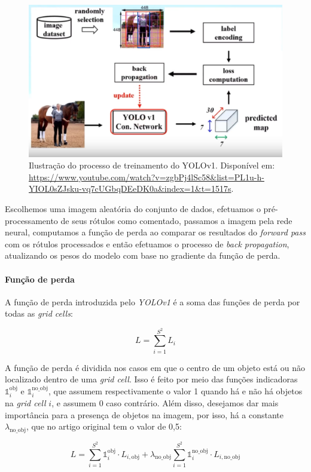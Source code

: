 \begin{figure}[htb!]
    \centering
    \includegraphics[width=0.8\linewidth]{images/yolo_train.png}
    \caption{\label{fig:yolo_train} Ilustração do processo de treinamento do YOLOv1. Disponível em: \url{https://www.youtube.com/watch?v=zgbPj4lSc58&list=PL1u-h-YIOL0sZJsku-vq7cUGbqDEeDK0a&index=1&t=1517s}.}
\end{figure}

Escolhemos uma imagem aleatória do conjunto de dados, efetuamos o pré-processamento de seus rótulos como comentado, passamos a imagem pela rede neural, computamos a função de perda ao comparar os resultados do \emph{forward pass} com os rótulos processados e então efetuamos o processo de \emph{back propagation}, atualizando os pesos do modelo com base no gradiente da função de perda. 

\paragraph{Função de perda}
A função de perda introduzida pelo \emph{YOLOv1} é a soma das funções de perda por todas as \emph{grid cells}:
\begin{center}
\[
L = \sum_{i=1}^{S^2} L_i
\]
\end{center}
A função de perda é dividida nos casos em que o centro de um objeto está ou não localizado dentro de uma \emph{grid cell}. Isso é feito por meio das funções indicadoras $\mathds{1}_i^{\text{obj}}$ e $\mathds{1}_i^{\text{no\_obj}}$, que assumem respectivamente o valor 1 quando há e não há objetos na \emph{grid cell} $i$, e assumem 0 caso contrário. Além disso, desejamos dar mais importância para a presença de objetos na imagem, por isso, há a constante $\lambda_{\text{no\_obj}}$, que no artigo original tem o valor de 0,5:
\begin{center}
\[
L = \sum_{i=1}^{S^2} \mathds{1}_i^{\text{obj}} \cdot L_{i, \text{obj}} + \lambda_{\text{no\_obj}} \sum_{i=1}^{S^2} \mathds{1}_i^{\text{no\_obj}} \cdot L_{i, \text{no\_obj}}
\]
\end{center}


